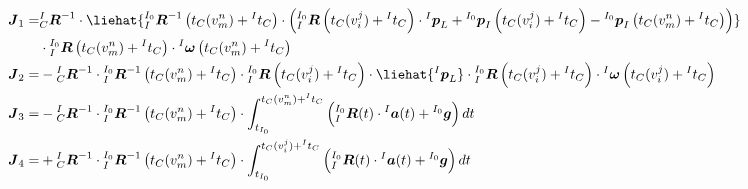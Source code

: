 \begin{equation*}
  \begin{aligned}
    \boldsymbol{J}_1= & {{^{I}_{C}}\boldsymbol{R}^{-1}}\cdot\liehat{{{^{I_0}_{I}}\boldsymbol{R}^{-1}\left( t_{C}(v_m^n)+{^{I}t_C}\right) }\cdot\left( {{^{I_0}_{I}}\boldsymbol{R}\left( t_{C}(v_i^j)+{^{I}t_C}\right)}
    \cdot{^{I}\boldsymbol{p}_L}+{^{I_0}\boldsymbol{p}_I\left( t_{C}(v_i^j)+{^{I}t_C}\right)}-{^{I_0}\boldsymbol{p}_I\left( t_{C}(v_m^n)+{^{I}t_C}\right)}\right) }
    \\
                      & \cdot{{^{I_0}_{I}}\boldsymbol{R}\left( t_{C}(v_m^n)+{^{I}t_C}\right) }
    \cdot{^{I}\boldsymbol{\omega}}\left( t_{C}(v_m^n)+{^{I}t_C}\right)
    \\
    \boldsymbol{J}_2= & -
    {{^{I}_{C}}\boldsymbol{R}^{-1}}\cdot{{^{I_0}_{I}}\boldsymbol{R}^{-1}\left( t_{C}(v_m^n)+{^{I}t_C}\right) }\cdot{{^{I_0}_{I}}\boldsymbol{R}\left( t_{C}(v_i^j)+{^{I}t_C}\right) }
    \cdot\liehat{{^{I}\boldsymbol{p}_L}}
    \cdot{{^{I_0}_{I}}\boldsymbol{R}\left( t_{C}(v_i^j)+{^{I}t_C}\right) }
    \cdot{^{I}\boldsymbol{\omega}}\left( t_{C}(v_i^j)+{^{I}t_C}\right)
    \\
    \boldsymbol{J}_3= & -{{^{I}_{C}}\boldsymbol{R}^{-1}}
    \cdot{{^{I_0}_{I}}\boldsymbol{R}^{-1}\left( t_{C}(v_m^n)+{^{I}t_C}\right) }
    \cdot
    \int_{t_{I_0}}^{t_{C}(v_m^n)+{^{I}t_C}}\left( {^{I_0}_{I}\boldsymbol{R}}(t)\cdot{^{I}\boldsymbol{a}}(t)+{^{I_0}\boldsymbol{g}}\right)dt
    \\
    \boldsymbol{J}_4= & +
    {{^{I}_{C}}\boldsymbol{R}^{-1}}\cdot{{^{I_0}_{I}}\boldsymbol{R}^{-1}\left( t_{C}(v_m^n)+{^{I}t_C}\right) }
    \cdot
    \int_{t_{I_0}}^{t_{C}(v_i^j)+{^{I}t_C}}\left( {^{I_0}_{I}\boldsymbol{R}}(t)\cdot{^{I}\boldsymbol{a}}(t)+{^{I_0}\boldsymbol{g}}\right)dt
  \end{aligned}
\end{equation*}
